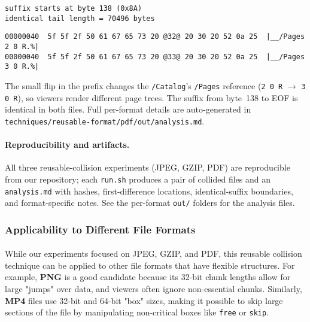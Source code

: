 \documentclass[runningheads]{llncs}
\begin{document}
    \begin{lstlisting}[style=textblock, caption={Identical suffix boundary}, label={lst:pdf-suffix}]
suffix starts at byte 138 (0x8A)
identical tail length = 70496 bytes
    \end{lstlisting}

    \begin{lstlisting}[style=hexhi, caption={GZIP prefix excerpt (visible flip)}, label={lst:gziphex}]
00000040  5f 5f 2f 50 61 67 65 73 20 @32@ 20 30 20 52 0a 25  |__/Pages 2 0 R.%|
00000040  5f 5f 2f 50 61 67 65 73 20 @33@ 20 30 20 52 0a 25  |__/Pages 3 0 R.%|
    \end{lstlisting}

    \textit{} The small flip in the prefix changes the \texttt{/Catalog}’s \texttt{/Pages} reference (\texttt{2 0 R} $\rightarrow$ \texttt{3 0 R}), so viewers render different page trees. The suffix from byte~138 to EOF is identical in both files. Full per-format details are auto-generated in \texttt{techniques/reusable-format/pdf/out/analysis.md}.


    \paragraph{Reproducibility and artifacts.}
    All three reusable-collision experiments (JPEG, GZIP, PDF) are reproducible from our repository; each \texttt{run.sh} produces a pair of collided files and an \texttt{analysis.md} with hashes, first-difference locations, identical-suffix boundaries, and format-specific notes. See the per-format \texttt{out/} folders for the analysis files.

    \subsubsection{Applicability to Different File Formats}

    \paragraph{}
    While our experiments focused on JPEG, GZIP, and PDF, this reusable collision technique can be applied to other file formats that have flexible structures. For example, \textbf{PNG} is a good candidate because its 32-bit chunk lengths allow for large "jumps" over data, and viewers often ignore non-essential chunks. Similarly, \textbf{MP4} files use 32-bit and 64-bit "box" sizes, making it possible to skip large sections of the file by manipulating non-critical boxes like \texttt{free} or \texttt{skip}.
\end{document}
